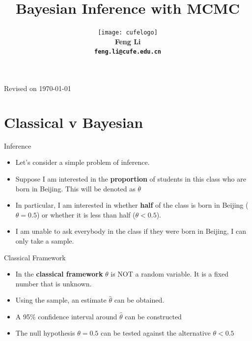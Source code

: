 \documentclass[10pt]{beamer}
\title[Statistical Computing]{{\textbf{Bayesian Inference with MCMC}}}
\author[Feng Li]{\texttt{[image: cufelogo]}\\
  \vspace{0.5cm}\textbf{Feng Li\\\texttt{feng.li@cufe.edu.cn}}}
\institute[SAM.CUFE.EDU.CN]{\footnotesize{\textbf{School of Statistics and Mathematics\\
      Central University of Finance and Economics}}}
\date{}
\begin{document}
\begin{frame}[plain]
  \titlepage
  \tiny{Revised on \today}
\end{frame}







\section{Classical v Bayesian}
\begin{frame}{Inference}
  \begin{itemize}
  \item Let's consider a simple problem of inference.

  \item Suppose I am interested in the {\bf proportion} of students in this class who are born in Beijing.  This will be denoted as $\theta$

  \item In particular, I am interested in whether {\bf half} of the class is born in Beijing ($\theta=0.5$) or whether it is less than half ($\theta<0.5$).

  \item I am unable to ask everybody in the class if they were born in Beijing, I can only take a sample.
  \end{itemize}
\end{frame}
\begin{frame}{Classical Framework}
  \begin{itemize}
  \item In the {\bf classical framework} $\theta$ is NOT a random variable.  It is a fixed number that is unknown.

  \item Using the sample, an estimate $\hat{\theta}$ can be obtained.

  \item A 95\% confidence interval around $\hat{\theta}$ can be constructed

  \item The null hypothesis $\theta=0.5$ can be tested against the alternative $\theta< 0.5$
  \end{itemize}
\end{frame}
\end{document}
